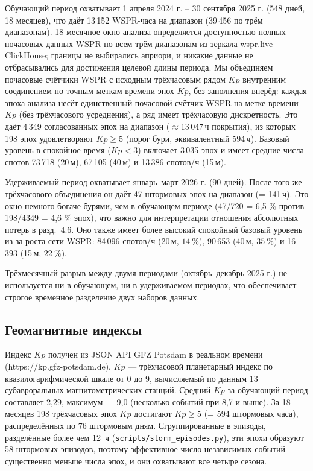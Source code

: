 \documentclass{agujournal2019}
\begin{document}
Обучающий период охватывает 1 апреля 2024 г. -- 30 сентября 2025 г.
(548 дней, 18 месяцев), что даёт 13\,152 WSPR-часа на диапазон
(39\,456 по трём диапазонам). 18-месячное окно анализа определяется
доступностью полных почасовых данных WSPR по всем трём диапазонам из
зеркала wspr.live ClickHouse; границы не выбирались априори, и никакие
данные не отбрасывались для достижения целевой длины периода. Мы объединяем
почасовые счётчики WSPR с исходным трёхчасовым рядом $Kp$ внутренним соединением по точным меткам времени эпох $Kp$, без заполнения вперёд: каждая эпоха анализа несёт единственный почасовой
счётчик WSPR на метке времени $Kp$ (без трёхчасового усреднения), а ряд имеет
трёхчасовую дискретность. Это даёт 4\,349 согласованных эпох на диапазон
($\approx$13\,047\,ч покрытия), из которых 198 эпох удовлетворяют
$Kp \ge 5$ (порог бури, эквивалентный 594\,ч). Базовый уровень в спокойное
время ($Kp < 3$) включает 3\,035 эпох и имеет средние числа спотов 73\,718
(20\,м), 67\,105 (40\,м) и 13\,386 спотов/ч (15\,м).

Удерживаемый период охватывает январь--март 2026 г. (90 дней).
После того же трёхчасового объединения он даёт 47 штормовых эпох на диапазон
(= 141\,ч). Это окно немного богаче бурями, чем в обучающем периоде
(47/720 = 6,5 \% против 198/4349 = 4,6 \% эпох), что важно для интерпретации
отношения абсолютных потерь в разд.~4.6. Оно также имеет более высокий
спокойный базовый уровень из-за роста сети WSPR: 84\,096 спотов/ч
(20\,м, $\SI{+14}{\percent}$), 90\,653 (40\,м, $\SI{+35}{\percent}$)
и 16\,393 (15\,м, $\SI{+22}{\percent}$).

Трёхмесячный разрыв между двумя периодами (октябрь--декабрь 2025 г.)
не используется ни в обучающем, ни в удерживаемом периодах, что
обеспечивает строгое временное разделение двух наборов данных.

\subsection{Геомагнитные индексы}

Индекс $Kp$ получен из JSON API GFZ Potsdam в реальном времени
(https://kp.gfz-potsdam.de). $Kp$ — трёхчасовой планетарный индекс по
квазилогарифмической шкале от 0 до 9, вычисляемый по данным 13
субавроральных магнитометрических станций. Средний $Kp$ за обучающий
период составляет 2,29, максимум — 9,0 (несколько событий при 8,7 и выше).
За 18 месяцев 198 трёхчасовых эпох $Kp$ достигают $Kp \ge 5$ (= 594 штормовых
часа), распределённых по 76 штормовым дням. Сгруппированные в эпизоды,
разделённые более чем 12~ч (\texttt{scripts/storm\_episodes.py}), эти эпохи
образуют 58 штормовых эпизодов, поэтому эффективное число независимых
событий существенно меньше числа эпох, и они охватывают все четыре сезона.
\end{document}
